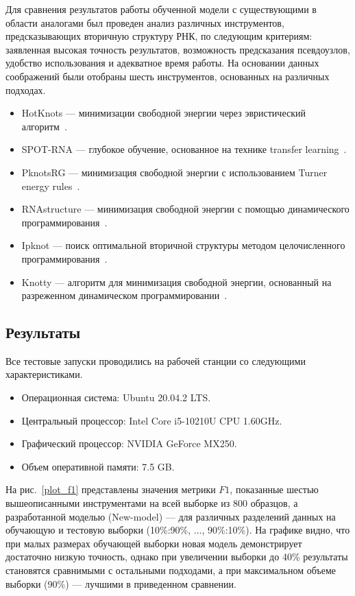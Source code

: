 Для сравнения результатов работы обученной модели с существующими в области аналогами был проведен анализ различных инструментов, предсказывающих вторичную структуру РНК, по следующим критериям: заявленная высокая точность результатов, возможность предсказания псевдоузлов, удобство использования и адекватное время работы. На основании данных соображений были отобраны шесть инструментов, основанных на различных подходах.
\begin{itemize}
    \item HotKnots --- минимизации свободной энергии через эвристический алгоритм~\cite{ren2005hotknots}.
    \item SPOT-RNA --- глубокое обучение, основанное на технике transfer learning~\cite{singh2019rna}.
    \item PknotsRG --- минимизация свободной энергии с использованием Turner energy rules~\cite{reeder2007pknotsrg}.
    \item RNAstructure --- минимизация свободной энергии с помощью динамического программирования~\cite{bellaousov2013rnastructure}.
    \item Ipknot --- поиск оптимальной вторичной структуры методом целочисленного программирования~\cite{sato2011ipknot}.
    \item Knotty --- алгоритм для минимизация свободной энергии, основанный на разреженном динамическом программировании~\cite{jabbari2018knotty}.
\end{itemize}

\subsection{Результаты}
Все тестовые запуски проводились на рабочей станции со следующими характеристиками.
\begin{itemize}
    \item Операционная система: Ubuntu 20.04.2 LTS.
    \item Центральный процессор: Intel Core i5-10210U CPU 1.60GHz.
    \item Графический процессор: NVIDIA GeForce MX250.
    \item Объем оперативной памяти: 7.5 GB.
\end{itemize}

На рис.~\ref{plot_f1} представлены значения метрики $F1$, показанные шестью вышеописанными инструментами на всей выборке из 800 образцов, а разработанной моделью (New-model) --- для различных разделений данных на обучающую и тестовую выборки (10\%:90\%, ..., 90\%:10\%). На графике видно, что при малых размерах обучающей выборки новая модель демонстрирует достаточно низкую точность, однако при увеличении выборки до 40\% результаты становятся сравнимыми с остальными подходами, а при максимальном объеме выборки (90\%) ---  лучшими в приведенном сравнении.

